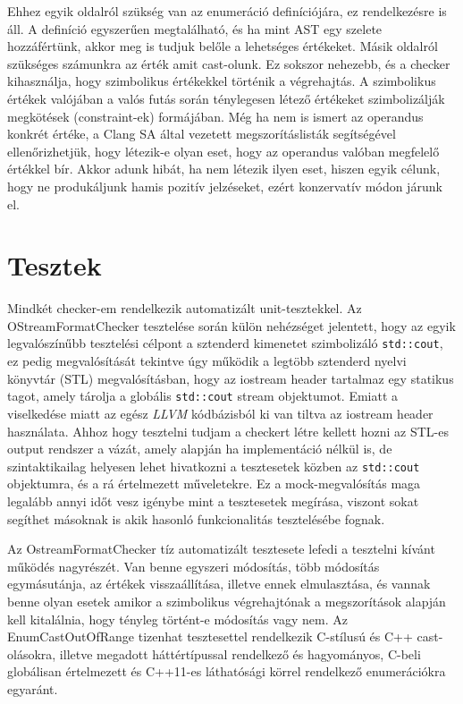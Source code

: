 \documentclass[a4paper,12pt]{report}
\begin{document}
Ehhez egyik oldalról szükség van az enumeráció definíciójára, ez rendelkezésre is áll. A definíció egyszerűen megtalálható, és ha mint AST egy szelete hozzáfértünk, akkor meg is tudjuk belőle a lehetséges értékeket. Másik oldalról szükséges számunkra az érték amit cast-olunk. Ez sokszor nehezebb, és a checker kihasználja, hogy szimbolikus értékekkel történik a végrehajtás. A szimbolikus értékek valójában a valós futás során ténylegesen létező értékeket szimbolizálják megkötések (constraint-ek) formájában. Még ha nem is ismert az operandus konkrét értéke, a Clang SA által vezetett megszorításlisták segítségével ellenőrizhetjük, hogy létezik-e olyan eset, hogy az operandus valóban megfelelő értékkel bír. Akkor adunk hibát, ha nem létezik ilyen eset, hiszen egyik célunk, hogy ne produkáljunk hamis pozitív jelzéseket, ezért konzervatív módon járunk el.


\chapter{Tesztek}

Mindkét checker-em rendelkezik automatizált unit-tesztekkel. Az OStreamFormatChecker tesztelése során külön nehézséget jelentett, hogy az egyik legvalószínűbb tesztelési célpont a sztenderd kimenetet szimbolizáló \texttt{std::cout}, ez pedig megvalósítását tekintve úgy működik a legtöbb sztenderd nyelvi könyvtár (STL) megvalósításban, hogy az iostream header tartalmaz egy statikus tagot, amely tárolja a globális \texttt{std::cout} stream objektumot. Emiatt a viselkedése miatt az egész \emph{LLVM} kódbázisból ki van tiltva az iostream header használata. Ahhoz hogy tesztelni tudjam a checkert létre kellett hozni az STL-es output rendszer a vázát, amely alapján ha implementáció nélkül is, de szintaktikailag helyesen lehet hivatkozni a tesztesetek közben az \texttt{std::cout} objektumra, és a rá értelmezett műveletekre. Ez a mock-megvalósítás maga legalább annyi időt vesz igénybe mint a tesztesetek megírása, viszont sokat segíthet másoknak is akik hasonló funkcionalitás tesztelésébe fognak.

Az OstreamFormatChecker tíz automatizált tesztesete lefedi a tesztelni kívánt működés nagyrészét. Van benne egyszeri módosítás, több módosítás egymásutánja, az értékek visszaállítása, illetve ennek elmulasztása, és vannak benne olyan esetek amikor a szimbolikus végrehajtónak a megszorítások alapján kell kitalálnia, hogy tényleg történt-e módosítás vagy nem. Az EnumCastOutOfRange tizenhat tesztesettel rendelkezik C-stílusú és C++ cast-olásokra, illetve megadott háttértípussal rendelkező és hagyományos, C-beli globálisan értelmezett és C++11-es láthatósági körrel rendelkező enumerációkra egyaránt.
\end{document}
